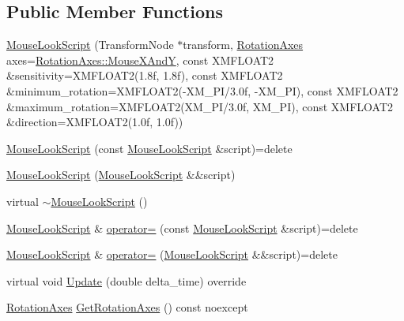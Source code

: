\subsection*{Public Member Functions}
\begin{DoxyCompactItemize}
\item 
\hyperlink{classmage_1_1_mouse_look_script_a6f2e447da00bbea7cf146b4d2aef3a57}{Mouse\+Look\+Script} (Transform\+Node $\ast$transform, \hyperlink{classmage_1_1_mouse_look_script_af63fd955f796c11e0378813e5d1ab5f8}{Rotation\+Axes} axes=\hyperlink{classmage_1_1_mouse_look_script_af63fd955f796c11e0378813e5d1ab5f8a109431b32c091e8a7ad541546c66c522}{Rotation\+Axes\+::\+Mouse\+X\+AndY}, const X\+M\+F\+L\+O\+A\+T2 \&sensitivity=X\+M\+F\+L\+O\+A\+T2(1.\+8f, 1.\+8f), const X\+M\+F\+L\+O\+A\+T2 \&minimum\+\_\+rotation=\+X\+M\+F\+L\+O\+A\+T2(-\/\+X\+M\+\_\+\+P\+I/3.\+0f, -\/\+X\+M\+\_\+\+P\+I), const X\+M\+F\+L\+O\+A\+T2 \&maximum\+\_\+rotation=\+X\+M\+F\+L\+O\+A\+T2(\+X\+M\+\_\+\+P\+I/3.\+0f, X\+M\+\_\+\+P\+I), const X\+M\+F\+L\+O\+A\+T2 \&direction=\+X\+M\+F\+L\+O\+A\+T2(1.\+0f, 1.\+0f))
\item 
\hyperlink{classmage_1_1_mouse_look_script_a54bd09419068ab61c4dd6fda412771d3}{Mouse\+Look\+Script} (const \hyperlink{classmage_1_1_mouse_look_script}{Mouse\+Look\+Script} \&script)=delete
\item 
\hyperlink{classmage_1_1_mouse_look_script_aaca52076bde601772344c61639345e03}{Mouse\+Look\+Script} (\hyperlink{classmage_1_1_mouse_look_script}{Mouse\+Look\+Script} \&\&script)
\item 
virtual \hyperlink{classmage_1_1_mouse_look_script_ac402a33218e69d3594102b606dd051dc}{$\sim$\+Mouse\+Look\+Script} ()
\item 
\hyperlink{classmage_1_1_mouse_look_script}{Mouse\+Look\+Script} \& \hyperlink{classmage_1_1_mouse_look_script_a13fba7e90bf10d24814e0a8cec25645e}{operator=} (const \hyperlink{classmage_1_1_mouse_look_script}{Mouse\+Look\+Script} \&script)=delete
\item 
\hyperlink{classmage_1_1_mouse_look_script}{Mouse\+Look\+Script} \& \hyperlink{classmage_1_1_mouse_look_script_a2754174f5595fa424471c631818dc2b6}{operator=} (\hyperlink{classmage_1_1_mouse_look_script}{Mouse\+Look\+Script} \&\&script)=delete
\item 
virtual void \hyperlink{classmage_1_1_mouse_look_script_a7962403a78c02b2fe64e8f06f6319312}{Update} (double delta\+\_\+time) override
\item 
\hyperlink{classmage_1_1_mouse_look_script_af63fd955f796c11e0378813e5d1ab5f8}{Rotation\+Axes} \hyperlink{classmage_1_1_mouse_look_script_afe564764c233eab0f1183e4d4096c037}{Get\+Rotation\+Axes} () const noexcept

\end{DoxyCompactItemize}
